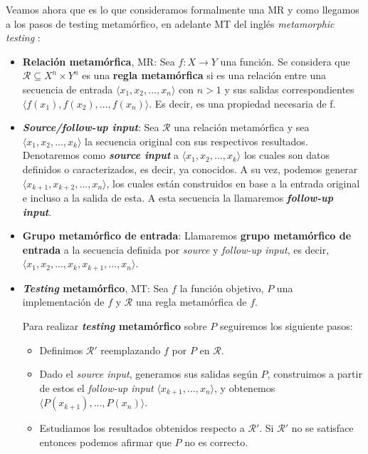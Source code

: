 Veamos ahora que es lo que consideramos formalmente una MR y como llegamos a los pasos de testing metamórfico, en adelante MT del inglés \textit{metamorphic testing} \cite{AR:MTmain:2008}:\newline

\begin{itemize}
    \item \textbf{Relación metamórfica}, MR: Sea $f: X \rightarrow Y$ una función. Se considera que $\mathscr{R} \subseteq X^{n} \times Y^{n}$ es una \textbf{regla metamórfica} si es una relación entre una secuencia de entrada $\langle x_{1},x_{2},...,x_{n}\rangle$ con $n>1$ y sus salidas correspondientes $\langle f(x_{1}),f(x_{2}),...,f(x_{n})\rangle$. Es decir, es una propiedad necesaria de f.
    \item \textbf{\textit{Source/follow-up input}}: Sea $\mathscr{R}$ una relación metamórfica y sea $\langle x_{1},x_{2},...,x_{k}\rangle$ la secuencia original con sus respectivos resultados. Denotaremos como \textbf{\textit{source input}} a   $\langle x_{1},x_{2},...,x_{k}\rangle$  los cuales son datos definidos o caracterizados, es decir, ya conocidos. A su vez, podemos generar $\langle x_{k+1},x_{k+2},...,x_{n}\rangle$, los cuales están construidos en base a la entrada original e incluso a la salida de esta. A esta secuencia la llamaremos \textbf{\textit{follow-up input}}.
    \item \textbf{Grupo metamórfico de entrada}: Llamaremos \textbf{grupo metamórfico de entrada} a la secuencia definida por \textit{source} y \textit{follow-up input}, es decir, $\langle x_{1},x_{2},...,x_{k},x_{k+1},...,x_{n}\rangle$.
    \item \textbf{\textit{Testing} metamórfico}, MT\label{Def:MT}: Sea $f$ la función objetivo, $P$ una implementación de $f$ y $\mathscr{R}$ una regla metamórfica de $f$.
    
    Para realizar \textbf{\textit{testing} metamórfico} sobre $P$ seguiremos los siguiente pasos:
    \begin{itemize}
        \item Definimos $\mathscr{R}'$ reemplazando $f$ por $P$ en $\mathscr{R}$.
        \item Dado el \textit{source input}, generamos sus salidas según $P$, construimos a partir de estos el \textit{follow-up input} $\langle x_{k+1},...,x_{n}\rangle$, y obtenemos $\langle P(x_{k+1}),...,P(x_{n})\rangle$.
        \item Estudiamos los resultados obtenidos respecto a $\mathscr{R}'$. Si $\mathscr{R}'$ no se satisface entonces podemos afirmar que $P$ no es correcto.
    \end{itemize}
\end{itemize}

